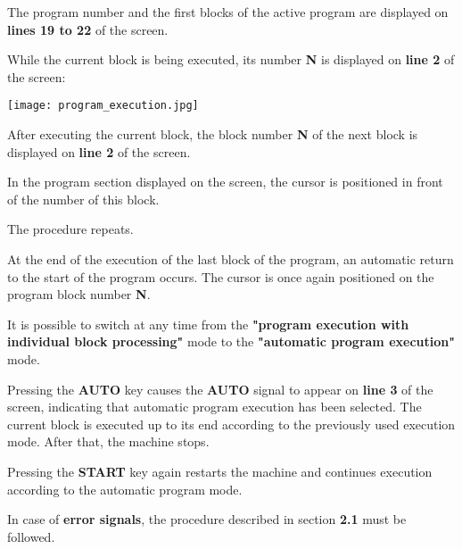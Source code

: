 \begin{itemize}
\end{itemize}

The program number and the first blocks of the active program are displayed on \textbf{lines 19 to 22} of the screen.

\begin{itemize}
\end{itemize}

While the current block is being executed, its number \textbf{N} is displayed on \textbf{line 2} of the screen:

\begin{center}
    \texttt{[image: program\_execution.jpg]}
\end{center}

After executing the current block, the block number \textbf{N} of the next block is displayed on \textbf{line 2} of the screen.

In the program section displayed on the screen, the cursor is positioned in front of the number of this block.

\begin{itemize}
\end{itemize}

The procedure repeats.

At the end of the execution of the last block of the program, an automatic return to the start of the program occurs.  
The cursor is once again positioned on the program block number \textbf{N}.

\notes

It is possible to switch at any time from the \textbf{"program execution with individual block processing"} mode  
to the \textbf{"automatic program execution"} mode.

Pressing the \textbf{AUTO} key causes the \textbf{AUTO} signal to appear on \textbf{line 3} of the screen,  
indicating that automatic program execution has been selected. The current block is executed up to its end  
according to the previously used execution mode. After that, the machine stops.

Pressing the \textbf{START} key again restarts the machine and continues execution according to the automatic program mode.

In case of \textbf{error signals}, the procedure described in section \textbf{2.1} must be followed.

